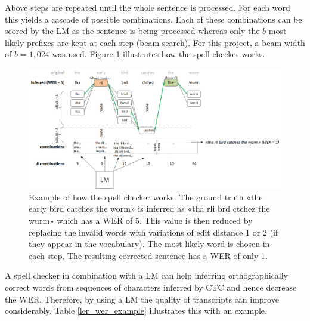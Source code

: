 Above steps are repeated until the whole sentence is processed. For each word this yields a cascade of possible combinations. Each of these combinations can be scored by the \ac{LM} as the sentence is being processed whereas only the $b$ most likely prefixes are kept at each step (beam search). For this project, a beam width of $b = 1,024$ was used. Figure \ref{spell-checker} illustrates how the spell-checker works.

\begin{figure}[h!]
	\includegraphics[width=\linewidth]{./img/spell_checker.png}
	\caption{Example of how the spell checker works. The ground truth «the early bird catches the worm» is inferred as «tha rli brd ctchez the wurm» which has a \ac{WER} of 5. This value is then reduced by replacing the invalid words with variations of edit distance 1 or 2 (if they appear in the vocabulary). The most likely word is chosen in each step. The resulting corrected sentence has a \ac{WER} of only 1.}
	\label{spell-checker}
\end{figure}

A spell checker in combination with a \ac{LM} can help inferring orthographically correct words from sequences of characters inferred by \ac{CTC} and hence decrease the \ac{WER}. Therefore, by using a \ac{LM} the quality of transcripts can improve considerably. Table \ref{ler_wer_example} illustrates this with an example.

